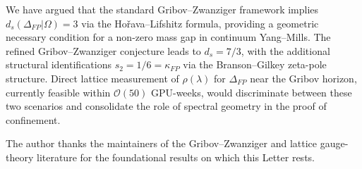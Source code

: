 \documentclass[aps,prl,reprint,nofootinbib,superscriptaddress,floatfix]{revtex4-2}
\begin{document}
We have argued that the standard Gribov--Zwanziger framework implies $d_s(\Delta_{FP}|\Omega) = 3$ via the Ho\v rava--Lifshitz formula, providing a geometric necessary condition for a non-zero mass gap in continuum Yang--Mills. The refined Gribov--Zwanziger conjecture leads to $d_s = 7/3$, with the additional structural identifications $s_2 = 1/6 = \kappa_{FP}$ via the Branson--Gilkey zeta-pole structure. Direct lattice measurement of $\rho(\lambda)$ for $\Delta_{FP}$ near the Gribov horizon, currently feasible within $\mathcal{O}(50)$ GPU-weeks, would discriminate between these two scenarios and consolidate the role of spectral geometry in the proof of confinement.

\begin{acknowledgments}
The author thanks the maintainers of the Gribov--Zwanziger and lattice gauge-theory literature for the foundational results on which this Letter rests.
\end{acknowledgments}
\end{document}
